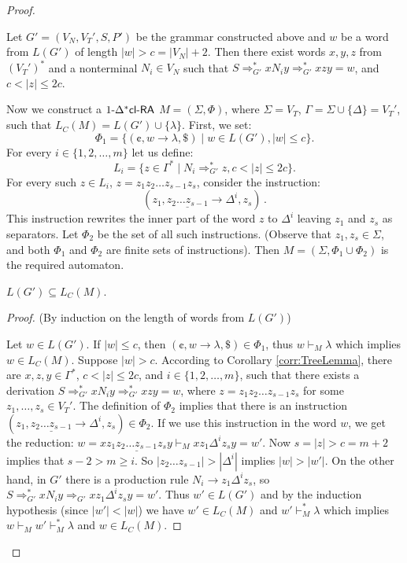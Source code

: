 \begin{proof}
\begin{corollary}\label{corr:TreeLemma}
Let $G'=(V_N,V_T',S,P')$ be the grammar constructed above and $w$ be a word from $L(G')$ of length $|w|>c=|V_N|+2$. Then there exist words $x,y,z$ from $(V_T')^*$ and a nonterminal $N_i \in V_N$ such that $S \Rightarrow_{G'}^* x N_i y \Rightarrow_{G'}^* xzy = w$, and $c < |z| \le 2c$.
\end{corollary}

Now we construct a $\kDXclRA[1]$ $M = (\Sigma, \Phi)$, where $\Sigma = V_T$, $\Gamma = \Sigma \cup \{\Delta\} = V_T'$, such that $L_C(M) = L(G') \cup \{ \lambda \}$. First, we set:
$$\Phi_1 = \{ (\cent, w \to \lambda, \$) \mid w \in L(G'), |w| \le c \}.$$
For every $i \in \{1, 2, \ldots, m\}$ let us define:
$$L_i = \{z \in \Gamma^* \mid N_i \Rightarrow_{G'}^* z, c < |z| \le 2c\}.$$
For every such $z \in L_i$, $z = z_1 z_2 \ldots z_{s-1} z_s$, consider the instruction:
$$(z_1, \underline{z_2 \ldots z_{s-1}} \to \Delta^i, z_s)\,.$$
This instruction rewrites the inner part of the word $z$ to $\Delta^i$ leaving $z_1$ and $z_s$ as separators. Let $\Phi_2$ be the set of all such instructions. (Observe that $z_1, z_s \in \Sigma$, and both $\Phi_1$ and $\Phi_2$ are finite sets of instructions). Then $M = (\Sigma, \Phi_1 \cup \Phi_2)$ is the required automaton.

\begin{lemma}\label{theorem:GsubseteqM}
$L(G') \subseteq L_C(M)$.
\end{lemma}

\begin{proof}
(By induction on the length of words from $L(G')$)

Let $w \in L(G')$. If $|w| \le c$, then $(\cent, w \to \lambda, \$) \in \Phi_1$, thus $w \vdash_M \lambda$ which implies $w \in L_C(M)$. Suppose $|w| > c$. According to Corollary \ref{corr:TreeLemma}, there are $x, z, y \in \Gamma^*$, $c < |z| \le 2c$, and $i \in \{1, 2, \ldots, m\}$, such that there exists a derivation $S \Rightarrow_{G'}^* x N_i y \Rightarrow_{G'}^* xzy = w$, where $z = z_1 z_2 \ldots z_{s-1} z_s$ for some $z_1,\dots,z_s \in V_T'$. The definition of $\Phi_2$ implies that there is an instruction $(z_1, \underline{z_2 \ldots z_{s-1}} \to \Delta^i, z_s) \in \Phi_2$. If we use this instruction in the word $w$, we get the reduction: $w = x z_1 \underline{z_2 \ldots z_{s-1}} z_s y \vdash_M x z_1 \Delta^i z_s y = w'$. Now $s = |z| > c = m + 2$ implies that $s - 2 > m \ge i$. So $|z_2 \ldots z_{s-1}| > |\Delta^i|$ implies $|w| > |w'|$. On the other hand, in $G'$ there is a production rule $N_i \to z_1 \Delta^i z_s$, so $S \Rightarrow_{G'}^* x N_i y \Rightarrow_{G'} x z_1 \Delta^i z_s y = w'$. Thus $w' \in L(G')$ and by the induction hypothesis (since $|w'| < |w|$) we have $w' \in L_C(M)$ and $w' \vdash_M^* \lambda$ which implies $w \vdash_M w' \vdash_M^* \lambda$ and $w \in L_C(M)$.
\end{proof}


\end{proof}
